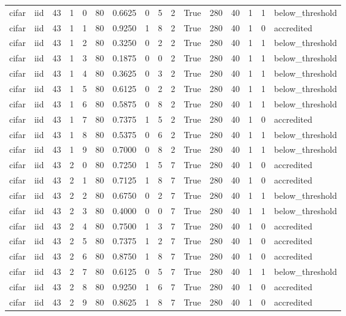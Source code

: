 \begin{tabular}{llrrrrrrrrrrrrrl}
cifar & iid & 43 & 1 & 0 & 80 & 0.6625 & 0 & 5 & 2 & True & 280 & 40 & 1 & 1 & below\_threshold \\
cifar & iid & 43 & 1 & 1 & 80 & 0.9250 & 1 & 8 & 2 & True & 280 & 40 & 1 & 0 & accredited \\
cifar & iid & 43 & 1 & 2 & 80 & 0.3250 & 0 & 2 & 2 & True & 280 & 40 & 1 & 1 & below\_threshold \\
cifar & iid & 43 & 1 & 3 & 80 & 0.1875 & 0 & 0 & 2 & True & 280 & 40 & 1 & 1 & below\_threshold \\
cifar & iid & 43 & 1 & 4 & 80 & 0.3625 & 0 & 3 & 2 & True & 280 & 40 & 1 & 1 & below\_threshold \\
cifar & iid & 43 & 1 & 5 & 80 & 0.6125 & 0 & 2 & 2 & True & 280 & 40 & 1 & 1 & below\_threshold \\
cifar & iid & 43 & 1 & 6 & 80 & 0.5875 & 0 & 8 & 2 & True & 280 & 40 & 1 & 1 & below\_threshold \\
cifar & iid & 43 & 1 & 7 & 80 & 0.7375 & 1 & 5 & 2 & True & 280 & 40 & 1 & 0 & accredited \\
cifar & iid & 43 & 1 & 8 & 80 & 0.5375 & 0 & 6 & 2 & True & 280 & 40 & 1 & 1 & below\_threshold \\
cifar & iid & 43 & 1 & 9 & 80 & 0.7000 & 0 & 8 & 2 & True & 280 & 40 & 1 & 1 & below\_threshold \\
cifar & iid & 43 & 2 & 0 & 80 & 0.7250 & 1 & 5 & 7 & True & 280 & 40 & 1 & 0 & accredited \\
cifar & iid & 43 & 2 & 1 & 80 & 0.7125 & 1 & 8 & 7 & True & 280 & 40 & 1 & 0 & accredited \\
cifar & iid & 43 & 2 & 2 & 80 & 0.6750 & 0 & 2 & 7 & True & 280 & 40 & 1 & 1 & below\_threshold \\
cifar & iid & 43 & 2 & 3 & 80 & 0.4000 & 0 & 0 & 7 & True & 280 & 40 & 1 & 1 & below\_threshold \\
cifar & iid & 43 & 2 & 4 & 80 & 0.7500 & 1 & 3 & 7 & True & 280 & 40 & 1 & 0 & accredited \\
cifar & iid & 43 & 2 & 5 & 80 & 0.7375 & 1 & 2 & 7 & True & 280 & 40 & 1 & 0 & accredited \\
cifar & iid & 43 & 2 & 6 & 80 & 0.8750 & 1 & 8 & 7 & True & 280 & 40 & 1 & 0 & accredited \\
cifar & iid & 43 & 2 & 7 & 80 & 0.6125 & 0 & 5 & 7 & True & 280 & 40 & 1 & 1 & below\_threshold \\
cifar & iid & 43 & 2 & 8 & 80 & 0.9250 & 1 & 6 & 7 & True & 280 & 40 & 1 & 0 & accredited \\
cifar & iid & 43 & 2 & 9 & 80 & 0.8625 & 1 & 8 & 7 & True & 280 & 40 & 1 & 0 & accredited \\

\end{tabular}
